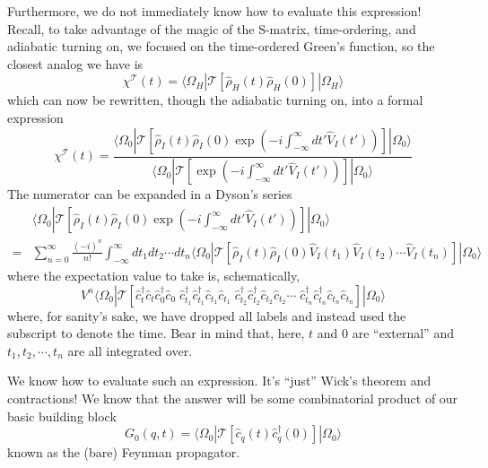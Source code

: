 Furthermore, we do not immediately know how to evaluate this expression! Recall, to take advantage of the magic of the S-matrix, time-ordering, and adiabatic turning on, we focused on the time-ordered Green's function, so the closest analog we have is
\[ \chi ^{\mathcal{T}}\left( t \right) =\langle \Omega _H|\mathcal{T} \left[ \hat{\rho}_H\left( t \right) \hat{\rho}_H\left( 0 \right) \right] |\Omega _H\rangle \]
which can now be rewritten, though the adiabatic turning on, into a formal expression
\[ \chi ^{\mathcal{T}}\left( t \right) =\frac{\langle \Omega _0|\mathcal{T} \left[ \hat{\rho}_I\left( t \right) \hat{\rho}_I\left( 0 \right) \exp \left( -i\int_{-\infty}^{\infty}{dt'\hat{V}_I\left( t' \right)} \right) \right] |\Omega _0\rangle}{\langle \Omega _0|\mathcal{T} \left[ \exp \left( -i\int_{-\infty}^{\infty}{dt'\hat{V}_I\left( t' \right)} \right) \right] |\Omega _0\rangle}\]
The numerator can be expanded in a Dyson's series
\begin{align*}
    &\langle \Omega _0|\mathcal{T} \left[ \hat{\rho}_I\left( t \right) \hat{\rho}_I\left( 0 \right) \exp \left( -i\int_{-\infty}^{\infty}{dt'\hat{V}_I\left( t' \right)} \right) \right] |\Omega _0\rangle \\
    =&\sum_{n=0}^{\infty}{\frac{\left( -i \right) ^n}{n!}\int_{-\infty}^{\infty}{dt_1dt_2\cdots dt_n\langle \Omega _0|\mathcal{T} \left[ \hat{\rho}_I\left( t \right) \hat{\rho}_I\left( 0 \right) \hat{V}_I\left( t_1 \right) \hat{V}_I\left( t_2 \right) \cdots \hat{V}_I\left( t_n \right) \right] |\Omega _0\rangle}}
\end{align*}
where the expectation value to take is, schematically,
\[ V^n\langle \Omega _0|\mathcal{T} \left[ \hat{c}_{t}^{\dagger}\hat{c}_t\hat{c}_{0}^{\dagger}\hat{c}_0\;\hat{c}_{t_1}^{\dagger}\hat{c}_{t_1}^{\dagger}\hat{c}_{t_1}\hat{c}_{t_1}\;\hat{c}_{t_2}^{\dagger}\hat{c}_{t_2}^{\dagger}\hat{c}_{t_2}\hat{c}_{t_2}\cdots \;\hat{c}_{t_n}^{\dagger}\hat{c}_{t_n}^{\dagger}\hat{c}_{t_n}\hat{c}_{t_n} \right] |\Omega _0\rangle \]
where, for sanity's sake, we have dropped all labels and instead used the subscript to denote the time. Bear in mind that, here, $t$ and $0$ are ``external'' and $t_1,t_2,\cdots,t_n$ are all integrated over.

We know how to evaluate such an expression. It's ``just'' Wick's theorem and contractions! We know that the answer will be some combinatorial product of our basic building block
\[ G_0\left( q,t \right) =\langle \Omega _0|\mathcal{T} \left[ \hat{c}_q\left( t \right) \hat{c}_{q}^{\dagger}\left( 0 \right) \right] |\Omega _0\rangle \]
known as the (bare) Feynman propagator.

